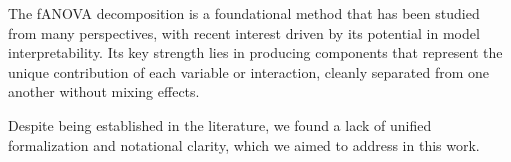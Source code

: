 






The fANOVA decomposition is a foundational method that has been studied from many perspectives, with recent interest driven by its potential in model interpretability. Its key strength lies in producing components that represent the unique contribution of each variable or interaction, cleanly separated from one another without mixing effects.\par

Despite being established in the literature, we found a lack of unified formalization and notational clarity, which we aimed to address in this work.\par

